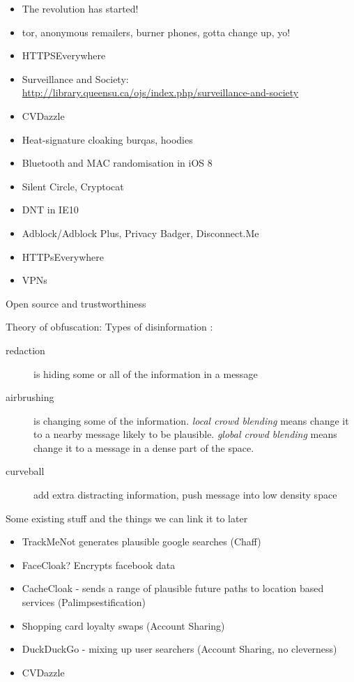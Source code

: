 \documentclass{IOS-Book-Article}     %
\begin{document}
\begin{itemize}
  \item The revolution has started!
  \item tor, anonymous remailers, burner phones, gotta change up, yo!
  \item HTTPSEverywhere
  \item Surveillance and Society: \url{http://library.queensu.ca/ojs/index.php/surveillance-and-society}
  \item CVDazzle
  \item Heat-signature cloaking burqas, hoodies
  \item Bluetooth and MAC randomisation in iOS 8
  \item Silent Circle, Cryptocat
  \item DNT in IE10
  \item Adblock/Adblock Plus, Privacy Badger, Disconnect.Me
  \item HTTPsEverywhere
  \item VPNs 
\end{itemize}

Open source and trustworthiness

Theory of obfuscation:
Types of disinformation \cite{alexander2010Disinformation}:
\begin{description}
  \item[redaction] is hiding some or all of the information in a message
  \item[airbrushing] is changing some of the information. \emph{local crowd
  blending} means change it to a nearby message likely to be plausible.
  \emph{global crowd blending} means change it to a message in a dense part of
  the space.
  \item[curveball] add extra distracting information, push message into low
  density space
\end{description}

Some existing stuff and the things we can link it to later

\begin{itemize}
  \item TrackMeNot generates plausible google searches (Chaff)
  \item FaceCloak? Encrypts facebook data
  \item CacheCloak - sends a range of plausible future paths to location based
  services (Palimpsestification)
  \item Shopping card loyalty swaps (Account Sharing)
  \item DuckDuckGo - mixing up user searchers (Account Sharing, no cleverness)
  \item CVDazzle
\end{itemize}
\end{document}
